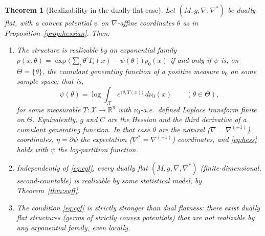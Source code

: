 \documentclass{amsart}
\newtheorem{theorem}{Theorem}
\theoremstyle{definition}
\theoremstyle{remark}
\begin{document}
\begin{theorem}[Realizability in the dually flat case]\label{thm:b}
Let $(M,g,\nabla,\nabla^{*})$ be dually flat, with a convex potential
$\psi$ on $\nabla$-affine coordinates $\theta$ as in
Proposition~\ref{prop:hessian}. Then:
\begin{enumerate}
\item\label{it:exp} The structure is realizable by an exponential family
$p(x,\theta)=\exp\bigl(\sum_{i}\theta^{i}T_{i}(x)-\psi(\theta)\bigr)\,
p_{0}(x)$ \emph{if and only if} $\psi$ is, on $\Theta=\{\theta\}$, the
cumulant generating function of a positive measure $\nu_{0}$ on some sample
space; that is,
\begin{equation}\label{eq:cgf}
  \psi(\theta)=\log\int_{\mathcal X}e^{\langle\theta,T(x)\rangle}\,d\nu_{0}(x)
  \qquad(\theta\in\Theta),
\end{equation}
for some measurable $T\colon\mathcal X\to\mathbb R^{n}$ with
$\nu_{0}$-a.e.\ defined Laplace transform finite on $\Theta$. Equivalently, $g$
and $C$ are the Hessian and the third derivative of a cumulant generating
function. In that case $\theta$ are the natural ($\nabla=\nabla^{(+1)}$)
coordinates, $\eta=\partial\psi$ the expectation ($\nabla^{*}=\nabla^{(-1)}$)
coordinates, and \eqref{eq:hess} holds with $\psi$ the log-partition function.
\item\label{it:always} Independently of \eqref{eq:cgf}, every dually flat
$(M,g,\nabla,\nabla^{*})$ (finite-dimensional, second-countable) is realizable by
\emph{some} statistical model, by Theorem~\ref{thm:suff}.
\item\label{it:obstruction} The condition \eqref{eq:cgf} is strictly stronger
than dual flatness: there exist dually flat structures (germs of strictly convex
potentials) that are \emph{not} realizable by any exponential family, even
locally.
\end{enumerate}
\end{theorem}
\end{document}
